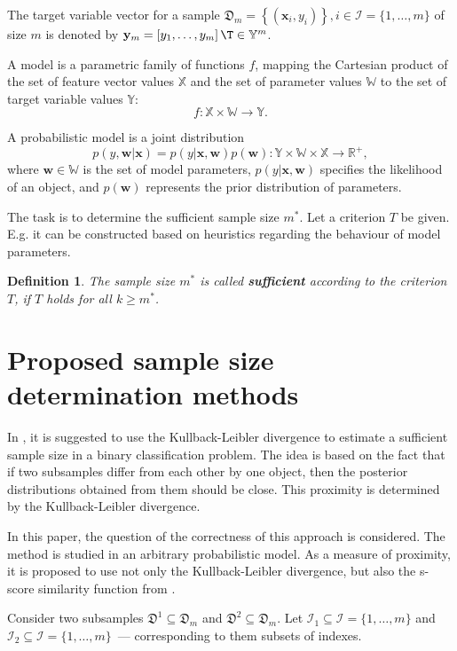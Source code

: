 \documentclass[sn-mathphys-num]{sn-jnl}%
\newtheorem{definition}{Definition}%
\begin{document}
The target variable vector for a sample $\mathfrak{D}_m = \left\{ (\mathbf{x}_i, y_i) \right\}, i \in \mathcal{I} = \{ 1, \ldots, m \}$ of size $m$ is denoted by $\mathbf{y}_m = \left[ y_1, \ldots, y_m \right]\T \in \mathbb{Y}^m$.

A model is a parametric family of functions $f$, mapping the Cartesian product of the set of feature vector values $\mathbb{X}$ and the set of parameter values $\mathbb{W}$ to the set of target variable values $\mathbb{Y}$: 
\[ f: \mathbb{X} \times \mathbb{W} \to \mathbb{Y}. \]

A probabilistic model is a joint distribution
\[ p(y, \mathbf{w} | \mathbf{x}) = p(y | \mathbf{x}, \mathbf{w}) p(\mathbf{w}): \mathbb{Y} \times \mathbb{W} \times \mathbb{X} \to \mathbb{R}^+, \]
where $\mathbf{w} \in \mathbb{W}$ is the set of model parameters, $p(y | \mathbf{x}, \mathbf{w})$ specifies the likelihood of an object, and $p(\mathbf{w})$ represents the prior distribution of parameters.

The task is to determine the sufficient sample size $m^*$. Let a criterion $T$ be given. E.g. it can be constructed based on heuristics regarding the behaviour of model parameters.
\begin{definition}
    The sample size $m^*$ is called \textbf{sufficient} according to the criterion $T$, if $T$ holds for all $k \geqslant m^*$.
\end{definition}

\section{Proposed sample size determination methods}
In \cite{MOTRENKO2014743}, it is suggested to use the Kullback-Leibler divergence to estimate a sufficient sample size in a binary classification problem. The idea is based on the fact that if two subsamples differ from each other by one object, then the posterior distributions obtained from them should be close. This proximity is determined by the Kullback-Leibler divergence. 

In this paper, the question of the correctness of this approach is considered. The method is studied in an arbitrary probabilistic model. As a measure of proximity, it is proposed to use not only the Kullback-Leibler divergence, but also the s-score similarity function from \cite{Aduenko2017}.

Consider two subsamples $\mathfrak{D}^1\subseteq\mathfrak{D}_m$ and $\mathfrak{D}^2\subseteq\mathfrak{D}_m$. Let $\mathcal{I}_1 \subseteq \mathcal{I} = \{1, \ldots, m\}$ and $\mathcal{I}_2 \subseteq \mathcal{I} =\{1, \ldots,m\}$~--- corresponding to them subsets of indexes.
\end{document}
